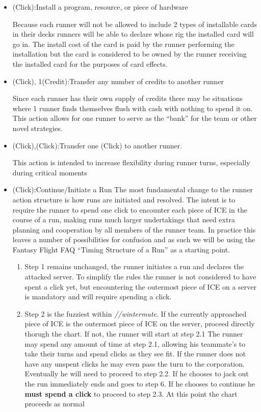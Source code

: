 \documentclass[titlepage]{article}
\begin{document}
\begin{itemize}
	\item (Click):Install a program, resource, or piece of hardware

		Because each runner will not be allowed to include 2 types of installable cards in their decks runners will be able to declare whose rig the installed card will go in. The install cost of the card is paid by the runner performing the installation but the card is considered to be owned by the runner receiving the installed card for the purposes of card effects. 

	\item (Click), 1(Credit):Transfer any number of credits to another runner

		Since each runner has their own supply of credits there may be situations where 1 runner finds themselves flush with cash with nothing to spend it on. This action allows for one runner to serve as the ``bank'' for the team or other novel strategies.

	\item (Click),(Click):Transfer one (Click) to another runner.

		This action is intended to increase flexibility during runner turns, especially during critical moments

	\item (Click):Continue/Initiate a Run 
		The most fundamental change to the runner action structure is how runs are initiated and resolved. The intent is to require the runner to spend one click to encounter each piece of ICE in the course of a run, making runs much larger undertakings that need extra planning and cooperation by all members of the runner team. In practice this leaves a number of possibilities for confusion and as such we will be using the Fantasy Flight FAQ ``Timing Structure of a Run'' as a starting point. 
		\begin{enumerate}
			\item Step 1 remains unchanged, the runner initiates a run and declares the attacked server. To simplify the rules the runner is not considered to have spent a click yet, but encountering the outermost piece of ICE on a server is mandatory and will require spending a click. 
			\item Step 2 is the fuzziest within \emph{//wintermute}. If the currently approached piece of ICE is the outermost piece of ICE on the server, proceed directly thorugh the chart. If not, the runner will start at step 2.1 The runner may spend any amount of time at step 2.1, allowing his teammate's to take their turns and spend clicks as they see fit. If the runner does not have any unspent clicks he may even pass the turn to the corporation. Eventually he will need to proceed to step 2.2. If he chooses to jack out the run immediately ends and goes to step 6. If he chooses to continue he \textbf{must spend a click} to proceed to step 2.3. At this point the chart proceeds as normal
		\end{enumerate}


\end{itemize}
\end{document}
